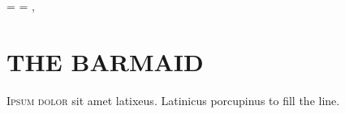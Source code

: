 \@specialfalse
\pdfpageheight=\paperheight
\pdfpagewidth=\paperwidth
{}
,

\chapter{THE BARMAID}
\begin{multicols}{3}
      \lettrine{I}{psum dolor} sit amet latixeus. \lipsum*[1-2]
      Latinicus porcupinus to fill the line.
\end{multicols}
\clearpage


